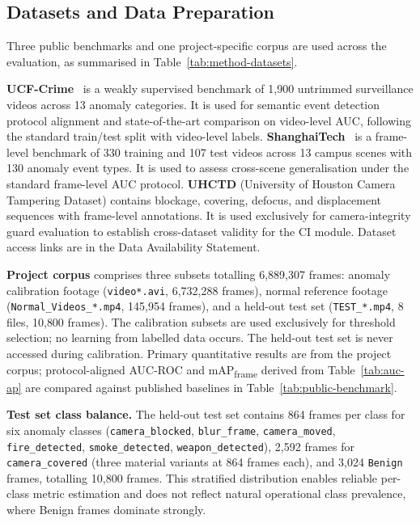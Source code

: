 \documentclass[sensors,article,submit,pdftex,moreauthors]{Definitions/mdpi}
\begin{document}
\subsection{Datasets and Data Preparation}
 
Three public benchmarks and one project-specific corpus are used across the evaluation, as summarised in Table~\ref{tab:method-datasets}.
 
\textbf{UCF-Crime}~\cite{sultani2018realworld} is a weakly supervised benchmark of 1,900 untrimmed surveillance videos across 13 anomaly categories. It is used for semantic event detection protocol alignment and state-of-the-art comparison on video-level AUC, following the standard train/test split with video-level labels. \textbf{ShanghaiTech}~\cite{georgescu2021anomaly} is a frame-level benchmark of 330 training and 107 test videos across 13 campus scenes with 130 anomaly event types. It is used to assess cross-scene generalisation under the standard frame-level AUC protocol. \textbf{UHCTD} (University of Houston Camera Tampering Dataset) contains blockage, covering, defocus, and displacement sequences with frame-level annotations. It is used exclusively for camera-integrity guard evaluation to establish cross-dataset validity for the CI module. Dataset access links are in the Data Availability Statement.
 
\textbf{Project corpus} comprises three subsets totalling 6{,}889{,}307 frames: anomaly calibration footage (\texttt{video*.avi}, 6{,}732{,}288 frames), normal reference footage (\texttt{Normal\_Videos\_*.mp4}, 145{,}954 frames), and a held-out test set (\texttt{TEST\_*.mp4}, 8 files, 10{,}800 frames). The calibration subsets are used exclusively for threshold selection; no learning from labelled data occurs. The held-out test set is never accessed during calibration. Primary quantitative results are from the project corpus; protocol-aligned AUC-ROC and mAP\textsubscript{frame} derived from Table~\ref{tab:auc-ap} are compared against published baselines in Table~\ref{tab:public-benchmark}.
 
\textbf{Test set class balance.} The held-out test set contains 864 frames per class for six anomaly classes (\texttt{camera\_blocked}, \texttt{blur\_frame}, \texttt{camera\_moved}, \texttt{fire\_detected}, \texttt{smoke\_detected}, \texttt{weapon\_detected}), 2{,}592 frames for \texttt{camera\_covered} (three material variants at 864 frames each), and 3{,}024 \texttt{Benign} frames, totalling 10{,}800 frames. This stratified distribution enables reliable per-class metric estimation and does not reflect natural operational class prevalence, where Benign frames dominate strongly.
 
\end{document}

